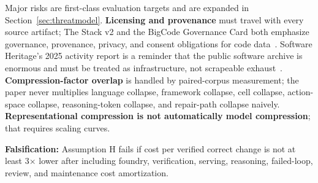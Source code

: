 Major risks are first-class evaluation targets and are expanded in Section~\ref{sec:threatmodel}. \textbf{Licensing and provenance} must travel with every source artifact; The Stack v2 and the BigCode Governance Card both emphasize governance, provenance, privacy, and consent obligations for code data~\cite{theStackV2,bigcodeGovernanceCard}. Software Heritage's 2025 activity report is a reminder that the public software archive is enormous and must be treated as infrastructure, not scrapeable exhaust~\cite{softwareHeritage2025}. \textbf{Compression-factor overlap} is handled by paired-corpus measurement; the paper never multiplies language collapse, framework collapse, cell collapse, action-space collapse, reasoning-token collapse, and repair-path collapse naively. \textbf{Representational compression is not automatically model compression}; that requires scaling curves.

\textbf{Falsification:} Assumption H fails if cost per verified correct change is not at least 3$\times$ lower after including foundry, verification, serving, reasoning, failed-loop, review, and maintenance cost amortization.

